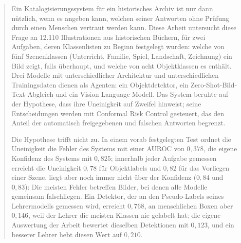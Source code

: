 
{\renewcommand{\abstractname}{Zusammenfassung}
\begin{abstract}
\thispagestyle{fancy}
Ein Katalogisierungssystem für ein historisches Archiv ist nur dann nützlich, wenn es angeben kann, welchen seiner Antworten ohne Prüfung durch einen Menschen vertraut werden kann. Diese Arbeit untersucht diese Frage an 12.110 Illustrationen aus historischen Büchern, für zwei Aufgaben, deren Klassenlisten zu Beginn festgelegt wurden: welche von fünf Szenenklassen (Unterricht, Familie, Spiel, Landschaft, Zeichnung) ein Bild zeigt, falls überhaupt, und welche von acht Objektklassen es enthält. Drei Modelle mit unterschiedlicher Architektur und unterschiedlichen Trainingsdaten dienen als Agenten: ein Objektdetektor, ein Zero-Shot-Bild-Text-Abgleich und ein Vision-Language-Modell. Das System beruhte auf der Hypothese, dass ihre Uneinigkeit auf Zweifel hinweist; seine Entscheidungen werden mit Conformal Risk Control gesteuert, das den Anteil der automatisch freigegebenen und falschen Antworten begrenzt.

Die Hypothese trifft nicht zu. In einem vorab festgelegten Test ordnet die Uneinigkeit die Fehler des Systems mit einer AUROC von $0{,}378$, die eigene Konfidenz des Systems mit $0{,}825$; innerhalb jeder Aufgabe gemessen erreicht die Uneinigkeit $0{,}78$ für Objektlabels und $0{,}82$ für das Vorliegen einer Szene, liegt aber noch immer nicht über der Konfidenz ($0{,}84$ und $0{,}83$): Die meisten Fehler betreffen Bilder, bei denen alle Modelle gemeinsam falschliegen. Ein Detektor, der an den Pseudo-Labels seines Lehrermodells gemessen wird, erreicht $0{,}768$, an menschlichen Boxen aber $0{,}146$, weil der Lehrer die meisten Klassen nie gelabelt hat; die eigene Auswertung der Arbeit bewertet dieselben Detektionen mit $0{,}123$, und ein besserer Lehrer hebt diesen Wert auf $0{,}210$.


\end{abstract}}
